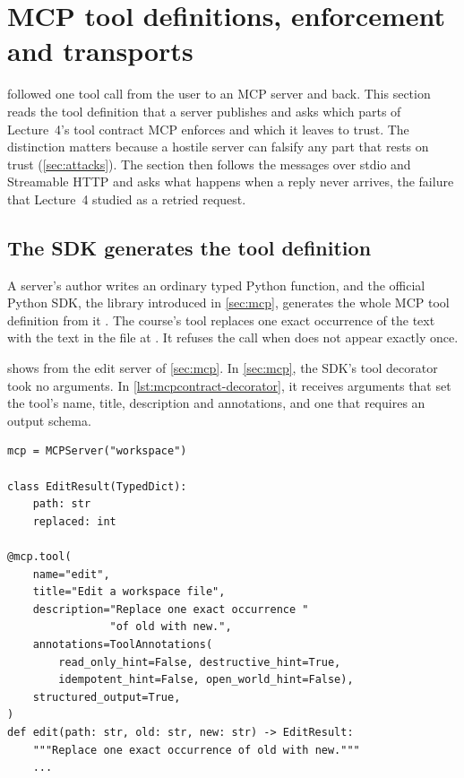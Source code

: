 \section{MCP tool definitions, enforcement and transports}
\label{sec:mcpcontract}

 followed one tool call from the user to an MCP server and back. This section reads
the tool definition that a server publishes and asks which parts of Lecture~4's tool contract MCP
enforces and which it leaves to trust. The distinction matters because a hostile server can falsify
any part that rests on trust (\cref{sec:attacks}). The section then follows the messages over stdio
and Streamable HTTP and asks what happens when a reply never arrives, the failure that Lecture~4
studied as a retried request.

\subsection{The SDK generates the tool definition}
\label{sec:mcpcontract-sdk}

A server's author writes an ordinary typed Python function, and the official Python SDK, the library
introduced in \cref{sec:mcp}, generates the whole MCP tool definition from it
\citep{mcp-python-sdk}. The course's  tool replaces one exact occurrence of the text
 with the text  in the file at . It refuses the call when
 does not appear exactly once.

 shows  from the edit server of \cref{sec:mcp}. In
\cref{sec:mcp}, the SDK's tool decorator took no arguments. In \cref{lst:mcpcontract-decorator}, it
receives arguments that set the tool's name, title, description and annotations, and one that
requires an output schema.

\noindent\begin{minipage}{\linewidth}
\begin{lstlisting}[basicstyle=\ttfamily\footnotesize, caption={Illustrative server code: the
\texttt{edit} tool with explicit arguments to the SDK's tool decorator.},
label=lst:mcpcontract-decorator]
mcp = MCPServer("workspace")

class EditResult(TypedDict):
    path: str
    replaced: int

@mcp.tool(
    name="edit",
    title="Edit a workspace file",
    description="Replace one exact occurrence "
                "of old with new.",
    annotations=ToolAnnotations(
        read_only_hint=False, destructive_hint=True,
        idempotent_hint=False, open_world_hint=False),
    structured_output=True,
)
def edit(path: str, old: str, new: str) -> EditResult:
    """Replace one exact occurrence of old with new."""
    ...
\end{lstlisting}
\end{minipage}

